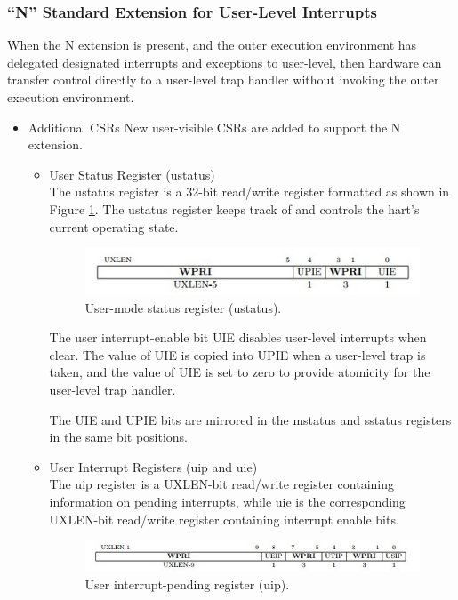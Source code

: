 \documentclass[../main.tex]{subfiles}
\begin{document}
\subsubsection*{“N” Standard Extension for User-Level Interrupts}
When the N extension is present, and the outer execution environment has delegated designated
interrupts and exceptions to user-level, then hardware can transfer control directly to a user-level
trap handler without invoking the outer execution environment.
\begin{itemize}
    \item[1- ]Additional CSRs
    New user-visible CSRs are added to support the N extension.
        \begin{itemize}
        \item User Status Register (ustatus)\\
        The ustatus register is a 32-bit read/write register formatted as shown in Figure \ref{fig:ustatus}. The
        ustatus register keeps track of and controls the hart’s current operating state.
        \begin{figure}[h!]
            \centering
            \includegraphics[width=10 cm]{diagrams/ustatus.jpg}
            \caption{User-mode status register (ustatus).}
            \label{fig:ustatus}
            \end{figure}
            
            The user interrupt-enable bit UIE disables user-level interrupts when clear. The value of UIE is
            copied into UPIE when a user-level trap is taken, and the value of UIE is set to zero to provide
            atomicity for the user-level trap handler.

            The UIE and UPIE bits are mirrored in the mstatus and sstatus registers in the same bit positions.\\
            
            \item User Interrupt Registers (uip and uie)\\
            The uip register is a UXLEN-bit read/write register containing information on pending interrupts,
            while uie is the corresponding UXLEN-bit read/write register containing interrupt enable bits.
            \begin{figure}[h!]
            \centering
            \includegraphics[width=15 cm]{diagrams/uip.jpg}
            \caption{User interrupt-pending register (uip).}
            \label{fig:uip}
            \end{figure}
            

\end{itemize}
\end{itemize}
\end{document}
